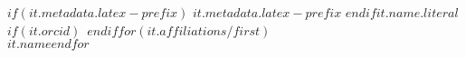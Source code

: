 $if(it.metadata.latex-prefix)$ $it.metadata.latex-prefix$ $endif$$it.name.literal$$if(it.orcid)$~$endif$$for(it.affiliations/first)$\\$it.name$$endfor$